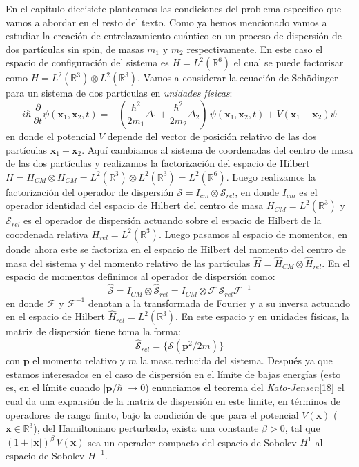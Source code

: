 \documentclass[12pt]{book}
\numberwithin{equation}{chapter}
\def\R{\mathbb{R}}
\def\S{\mathcal{S}}
\def\rar{\rightarrow}
\def\F{\mathcal{F}}
\def\pr{\otimes}
\def\x{\mathbf{x}}
\def\P{\mathbf{p}}
\begin{document}
En el capitulo diecisiete planteamos las condiciones del problema especifico que vamos a abordar en el resto del texto. Como ya hemos mencionado vamos a estudiar la creaci\'on de entrelazamiento cu\'antico en un proceso de dispersi\'on de dos part\'iculas sin spin, de masas $m_{1}$ y $m_{2}$ respectivamente. En este caso el espacio de configuraci\'on del sistema es $H=L^{2}(\R^{6})$ el cual se puede factorisar como $H=L^{2}(\R^{3}) \pr L^{2}(\R^{3})$. Vamos a considerar la ecuaci\'on de Sch\"odinger para un sistema de dos part\'iculas en \emph{unidades f\'isicas}:
$$ i \hbar \, \frac{\partial}{ \partial t } \psi (\x_{1} , \x_{2},t)= - \left( \frac{\hbar^{2}}{2m_{1}} \Delta_{1} + \frac{\hbar^{2}}{2m_{2}} \Delta_{2} \right) \, \psi (\x_{1},\x_{2},t)  + V(\x_{1}-\x_{2}) \psi $$
en donde el potencial $V$ depende del vector de posici\'on relativo de las dos part\'iculas $\x_{1}-\x_{2}$. Aqu\'i cambiamos al sistema de coordenadas del centro de masa de las dos part\'iculas y realizamos la factorizaci\'on del espacio de Hilbert $H=H_{CM} \pr H_{CM} =L^{2}(\R^{3}) \pr L^{2}(\R^{3})=L^{2}(\R^{6})$. Luego realizamos la factorizaci\'on del operador de dispersi\'on $\S = I_{cm} \pr \S_{rel}$, en donde $I_{cm}$ es el operador identidad del espacio de Hilbert del centro de masa $H_{CM}=L^{2}(\R^{3})$ y $\S_{rel}$ es el operador de dispersi\'on actuando sobre el espacio de Hilbert de la coordenada relativa $H_{rel}= L^{2}(\R^{3})$. Luego pasamos al espacio de momentos, en donde ahora este se factoriza en el espacio de Hilbert del momento del centro de masa del sistema y del momento relativo de las part\'iculas $\hat{H}= \hat{H}_{CM} \pr \hat{H}_{rel}$. En el espacio de momentos definimos al operador de dispersi\'on como:
$$ \hat{\S}= I_{CM} \pr \hat{\S}_{rel} = I_{CM} \pr \F\, \S_{rel} \F^{-1} $$
en donde $\F$ y $\F^{-1}$ denotan a la transformada de Fourier y a su inversa actuando en el espacio de Hilbert $\hat{H}_{rel}= L^{2}(\R^{3})$. En este espacio y en unidades f\'isicas, la matriz de dispersi\'on tiene toma la forma:
$$ \hat{\S}_{rel}= \{ \S(\P^{2}/2m) \} $$
con $\P$ el momento relativo y $m$ la masa reducida del sistema. Despu\'es ya que estamos interesados en el caso de dispersi\'on en el l\'imite de bajas energ\'ias (esto es, en el l\'imite cuando $|\P / \hbar| \rar 0$) enunciamos el teorema del \emph{Kato-Jensen}[18] el cual da una expansi\'on de la matriz de dispersi\'on en este limite, en t\'erminos de operadores de rango finito, bajo la condici\'on de que para el potencial $V(\x)$ ($\x \in \R^{3}$), del Hamiltoniano perturbado, exista una constante $\beta >0$, tal que $ (1+|\x|)^{\beta}\, V(\x) $ sea un operador compacto del espacio de Sobolev $H^{1}$ al espacio de Sobolev $H^{-1}$.\\
\end{document}
